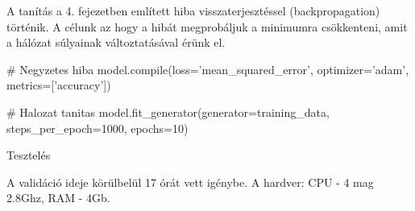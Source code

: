 A tanítás a 4. fejezetben említett hiba visszaterjesztéssel (backpropagation) történik. A célunk az hogy a hibát megprobáljuk a minimumra csökkenteni, amit a hálózat súlyainak változtatásával érünk el.

\begin{python}
# Negyzetes hiba
model.compile(loss='mean_squared_error',
              optimizer='adam',
              metrics=['accuracy'])

# Halozat tanitas
model.fit_generator(generator=training_data,
                    steps_per_epoch=1000, epochs=10)
\end{python}

Tesztelés

A validáció ideje körülbelül 17 órát vett igénybe. A hardver: CPU - 4 mag 2.8Ghz, RAM - 4Gb.
